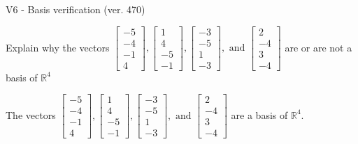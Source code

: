 \begin{exercise}
  \begin{exerciseTitle}V6 - Basis verification (ver. 470)\end{exerciseTitle}
  \begin{exerciseStatement}
    Explain why the vectors \(\left[\begin{array}{r}
-5 \\
-4 \\
-1 \\
4
\end{array}\right] , \left[\begin{array}{r}
1 \\
4 \\
-5 \\
-1
\end{array}\right] , \left[\begin{array}{r}
-3 \\
-5 \\
1 \\
-3
\end{array}\right] , \text{ and } \left[\begin{array}{r}
2 \\
-4 \\
3 \\
-4
\end{array}\right]\) are or are not a basis of \(\mathbb{R}^4\)	


  \end{exerciseStatement}
  \begin{exerciseAnswer}
   The vectors \(\left[\begin{array}{r}
-5 \\
-4 \\
-1 \\
4
\end{array}\right] , \left[\begin{array}{r}
1 \\
4 \\
-5 \\
-1
\end{array}\right] , \left[\begin{array}{r}
-3 \\
-5 \\
1 \\
-3
\end{array}\right] , \text{ and } \left[\begin{array}{r}
2 \\
-4 \\
3 \\
-4
\end{array}\right]\) 
  	 are  a basis of \(\mathbb{R}^4\).
  


  \end{exerciseAnswer}
\end{exercise}